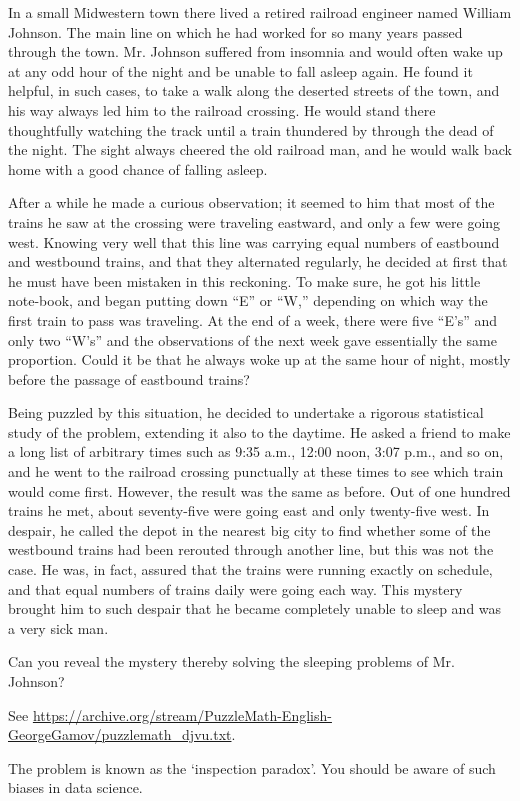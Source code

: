 \begin{exercise}
In a small Midwestern town there lived a retired railroad engineer named William
Johnson. The main line on which he had worked for so many years passed through the
town. Mr. Johnson suffered from insomnia and would often wake up at any odd hour of
the night and be unable to fall asleep again. He found it helpful, in such cases, to take a
walk along the deserted streets of the town, and his way always led him to the railroad
crossing. He would stand there thoughtfully watching the track until a train thundered by
through the dead of the night. The sight always cheered the old railroad man, and he
would walk back home with a good chance of falling asleep.

After a while he made a curious observation; it seemed to him that most of the trains he saw at the crossing were traveling eastward, and only a few were going west.
Knowing very well that this line was carrying equal numbers of eastbound and westbound trains, and that they alternated regularly, he decided at first that he must have been mistaken in this reckoning.
To make sure, he got his little note-book, and began putting down “E” or “W,” depending on which way the first train to pass was traveling.
At the end of a week, there were five “E’s” and only two “W’s” and the observations of the next week gave essentially the same proportion.
Could it be that he always woke up at the same hour of night, mostly before the passage of eastbound trains?

Being puzzled by this situation, he decided to undertake a rigorous statistical study of the problem, extending it also to the daytime.
He asked a friend to make a long list of arbitrary times such as 9:35 a.m., 12:00 noon, 3:07 p.m., and so on, and he went to the railroad crossing punctually at these times to see which train would come first.
However, the result was the same as before.
Out of one hundred trains he met, about seventy-five were going east and only twenty-five west.
In despair, he called the depot in the nearest big city to find whether some of the westbound trains had been rerouted through another line, but this was not the case.
He was, in fact, assured that the trains were running exactly on schedule, and that equal numbers of trains daily were going each way.
This mystery brought him to such despair that he became completely unable to sleep and was a very sick man.

Can you reveal the mystery thereby solving the sleeping problems of Mr. Johnson?
\begin{hint}
See \url{https://archive.org/stream/PuzzleMath-English-GeorgeGamov/puzzlemath_djvu.txt}.
\end{hint}
\begin{solution}
The problem is known as the `inspection paradox'. You should be aware of such biases in data science.
\end{solution}
\end{exercise}






